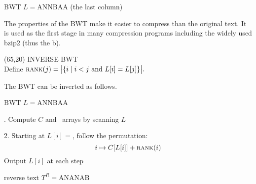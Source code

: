 \begin{textblock}{60}
{ BWT $L={}$ANNB\eos AA (the last column)
\vspace{3mm}
}

\footnotesize The properties of the BWT make it easier to
compress than the original text. It is used as the first stage in many
compression programs including the widely used bzip2 (thus the b).

\end{textblock} 

\begin{textblock}{60}(65,20)
  {\sffamily\normalsize{\color{sciorange}INVERSE BWT}}\vspace{1mm}\\
  \footnotesize 
  Define
  $
    \textsc{rank}(j)=\big|\{i \mid i<j \textrm{ and }
    L[i]=L[j]\}\big|.
  $

The BWT can be inverted as follows.
\vspace{3mm}

\scriptsize\sffamily
{} BWT $L={}$ANNB\eos AA
\vspace{2mm}

\quad\begin{minipage}{55mm}
\scriptsize{}. Compute $C$ and \rank\ arrays by scanning $L$
\scriptsize\sffamily
\begin{center}
\hspace*{-5mm}  
\end{center}
2. Starting at $L[i]={}$\eos, follow the permutation:
\[
i \mapsto C[L[i]]+\textsc{rank}(i)
\]
\hspace{2.3mm}Output $L[i]$ at each step
\end{minipage}
\vspace{2mm}

\scriptsize\sffamily
{} reverse text $T^R={}$\eos ANANAB

\end{textblock}
